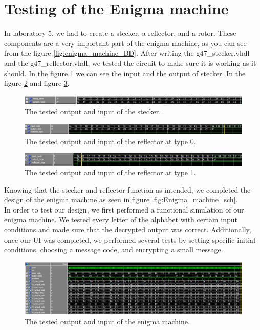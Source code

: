 \documentclass[10pt]{article}
\begin{document}
\section{Testing of the Enigma machine}
In laboratory 5, we had to create a stecker, a reflector, and a rotor. These components are a very important part of the enigma machine, as you can see from the figure \ref{fig:enigma_machine_BD}. After writing the g47\_stecker.vhdl and the g47\_reflector.vhdl, we tested the circuit to make sure it is working as it should. In the figure \ref{fig:stecker_test} we can see the input and the output of stecker. In the figure \ref{fig:refector_0_test} and figure \ref{fig:refector_1_test}.
\begin{figure}[!htb]
    \centering
    \includegraphics[width=1\textwidth]{./stecker_test.png}
    \caption{The tested output and input of the stecker.}
    \label{fig:stecker_test}
\end{figure}
\begin{figure}[!htb]
    \centering
    \includegraphics[width=1\textwidth]{./refector_0_test.png}
    \caption{The tested output and input of the reflector at type 0.}
    \label{fig:refector_0_test}
\end{figure}
\begin{figure}[!htb]
    \centering
    \includegraphics[width=1\textwidth]{./refector_1_test.png}
    \caption{The tested output and input of the reflector at type 1.}
    \label{fig:refector_1_test}
\end{figure}
Knowing that the stecker and reflector function as intended, we completed the design of the enigma machine as seen in figure \ref{fig:Enigma_machine_sch}.\\
In order to test our design, we first performed a functional simulation of our enigma machine. We tested every letter of the alphabet with certain input conditions and made sure that the decrypted output was correct. Additionally, once our UI was completed, we performed several tests by setting specific initial conditions, choosing a message code, and encrypting a small message.
\begin{figure}[!htb]
    \centering
    \includegraphics[width=1\textwidth]{./enigma_machine_test.png}
    \caption{The tested output and input of the enigma machine.}
    \label{fig:enigma_machine_test}
\end{figure}
\end{document}
